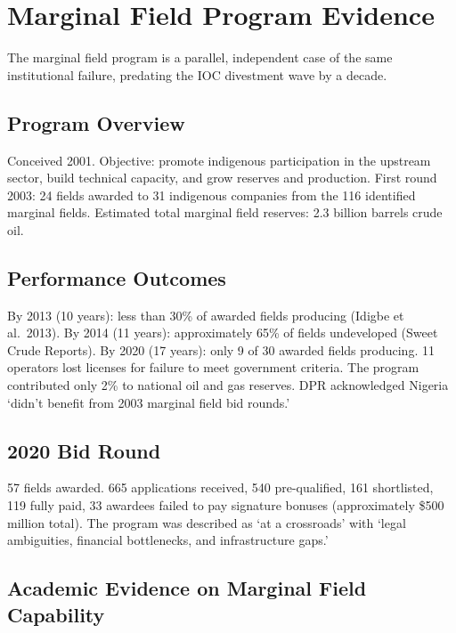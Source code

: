 \documentclass[twoside,fontset=lmodern]{mitthesis}
\begin{document}
\hypertarget{marginal-field-program-evidence}{%
\section{Marginal Field Program
Evidence}\label{marginal-field-program-evidence}}

The marginal field program is a parallel, independent case of the same
institutional failure, predating the IOC divestment wave by a decade.

\hypertarget{program-overview}{%
\subsection{Program Overview}\label{program-overview}}

Conceived 2001. Objective: promote indigenous participation in the
upstream sector, build technical capacity, and grow reserves and
production. First round 2003: 24 fields awarded to 31 indigenous
companies from the 116 identified marginal fields. Estimated total
marginal field reserves: 2.3 billion barrels crude oil.

\hypertarget{performance-outcomes}{%
\subsection{Performance Outcomes}\label{performance-outcomes}}

By 2013 (10 years): less than 30\% of awarded fields producing (Idigbe
et al.~2013). By 2014 (11 years): approximately 65\% of fields
undeveloped (Sweet Crude Reports). By 2020 (17 years): only 9 of 30
awarded fields producing. 11 operators lost licenses for failure to meet
government criteria. The program contributed only 2\% to national oil
and gas reserves. DPR acknowledged Nigeria `didn't benefit from 2003
marginal field bid rounds.'

\hypertarget{bid-round}{%
\subsection{2020 Bid Round}\label{bid-round}}

57 fields awarded. 665 applications received, 540 pre-qualified, 161
shortlisted, 119 fully paid, 33 awardees failed to pay signature bonuses
(approximately \$500 million total). The program was described as `at a
crossroads' with `legal ambiguities, financial bottlenecks, and
infrastructure gaps.'

\hypertarget{academic-evidence-on-marginal-field-capability}{%
\subsection{Academic Evidence on Marginal Field
Capability}\label{academic-evidence-on-marginal-field-capability}}
\end{document}
